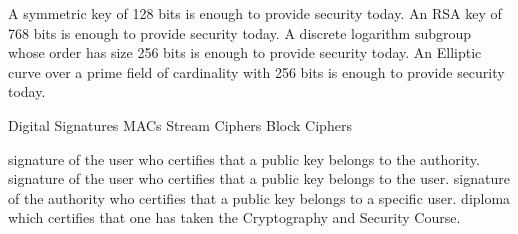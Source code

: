 	{A symmetric key of 128 bits is enough to provide security today.}
	{An RSA key of 768 bits is enough to provide security today.}
	{A discrete logarithm subgroup whose order has size 256 bits is enough to provide security today.}
	{An Elliptic curve over a prime field of cardinality with 256 bits is enough to provide
	security today.}
	
 {Digital Signatures}
 {MACs}
 {Stream Ciphers}
 {Block Ciphers}

{ signature of the user who certifies that a public key belongs to the authority.}
{ signature of the user who certifies that a public key belongs to the user.}
{ signature of the authority who certifies that a public key belongs to a specific user.}
{diploma which certifies that one has taken the Cryptography and Security Course.}

 
	
	
